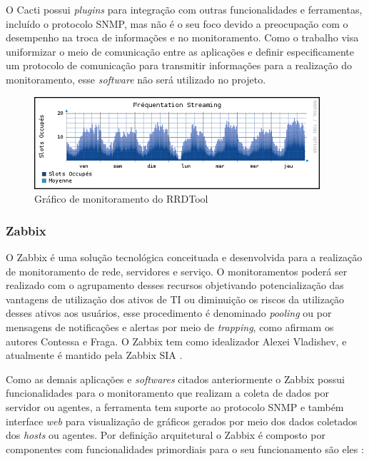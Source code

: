 O Cacti possui \textit{plugins} para integração com outras funcionalidades e ferramentas, incluído o protocolo \acrshort{SNMP}, mas não é o seu foco devido a preocupação com o desempenho na troca de informações e no monitoramento. Como o trabalho visa uniformizar o meio de comunicação entre as aplicações e definir especificamente um protocolo de comunicação para transmitir informações para a realização do monitoramento, esse \textit{software} não será utilizado no projeto.

\begin{figure}[H]
	\begin{center}
	\includegraphics[scale = 0.50]{img/stream-pop.png}
		\caption{Gráfico de monitoramento do RRDTool \cite{rrdtool}}
		\label{fun:fig:rrdtool}
	\end{center}
\end{figure}


\subsubsection{Zabbix}

O Zabbix é uma solução tecnológica conceituada e desenvolvida para a realização de monitoramento de rede, servidores e serviço. O monitoramentos poderá ser realizado com o agrupamento desses recursos objetivando potencialização das vantagens de utilização dos ativos de TI ou diminuição os riscos da utilização desses ativos aos usuários, esse procedimento é denominado \textit{pooling} ou por mensagens de notificações e alertas por meio de \textit{trapping}, como afirmam os autores Contessa e Fraga\cite{contessa2010gerenciamento}. O Zabbix tem como idealizador  Alexei Vladishev, e atualmente é mantido pela Zabbix SIA \cite{zabbix}.   

Como as demais aplicações e \textit{softwares} citados anteriormente o Zabbix possui funcionalidades para o monitoramento que realizam a coleta de dados por servidor ou agentes, a ferramenta tem suporte ao protocolo \acrshort{SNMP} e também interface \textit{web} para visualização de gráficos gerados por meio dos dados coletados dos \textit{hosts} ou agentes. Por definição arquitetural o Zabbix é composto por componentes com funcionalidades primordiais para o seu funcionamento são eles \cite{zabbix}: 

